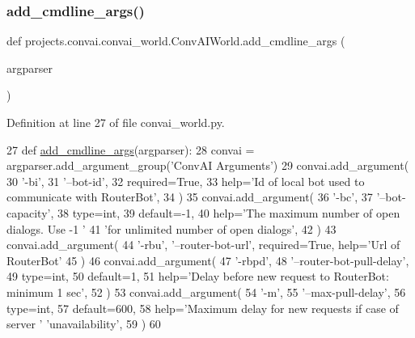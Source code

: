 \subsubsection{\texorpdfstring{add\+\_\+cmdline\+\_\+args()}{add\_cmdline\_args()}}
{\footnotesize\ttfamily def projects.\+convai.\+convai\+\_\+world.\+Conv\+A\+I\+World.\+add\+\_\+cmdline\+\_\+args (\begin{DoxyParamCaption}\item[{}]{argparser }\end{DoxyParamCaption})\hspace{0.3cm}{\ttfamily [static]}}



Definition at line 27 of file convai\+\_\+world.\+py.


\begin{DoxyCode}
27     \textcolor{keyword}{def }\hyperlink{namespaceparlai_1_1agents_1_1drqa_1_1config_a62fdd5554f1da6be0cba185271058320}{add\_cmdline\_args}(argparser):
28         convai = argparser.add\_argument\_group(\textcolor{stringliteral}{'ConvAI Arguments'})
29         convai.add\_argument(
30             \textcolor{stringliteral}{'-bi'},
31             \textcolor{stringliteral}{'--bot-id'},
32             required=\textcolor{keyword}{True},
33             help=\textcolor{stringliteral}{'Id of local bot used to communicate with RouterBot'},
34         )
35         convai.add\_argument(
36             \textcolor{stringliteral}{'-bc'},
37             \textcolor{stringliteral}{'--bot-capacity'},
38             type=int,
39             default=-1,
40             help=\textcolor{stringliteral}{'The maximum number of open dialogs. Use -1 '}
41             \textcolor{stringliteral}{'for unlimited number of open dialogs'},
42         )
43         convai.add\_argument(
44             \textcolor{stringliteral}{'-rbu'}, \textcolor{stringliteral}{'--router-bot-url'}, required=\textcolor{keyword}{True}, help=\textcolor{stringliteral}{'Url of RouterBot'}
45         )
46         convai.add\_argument(
47             \textcolor{stringliteral}{'-rbpd'},
48             \textcolor{stringliteral}{'--router-bot-pull-delay'},
49             type=int,
50             default=1,
51             help=\textcolor{stringliteral}{'Delay before new request to RouterBot: minimum 1 sec'},
52         )
53         convai.add\_argument(
54             \textcolor{stringliteral}{'-m'},
55             \textcolor{stringliteral}{'--max-pull-delay'},
56             type=int,
57             default=600,
58             help=\textcolor{stringliteral}{'Maximum delay for new requests if case of server '} \textcolor{stringliteral}{'unavailability'},
59         )
60 
\end{DoxyCode}
\mbox{\label{classprojects_1_1convai_1_1convai__world_1_1ConvAIWorld_a9c8d56249c8e47e399f1e5a5eda5193a}} 
